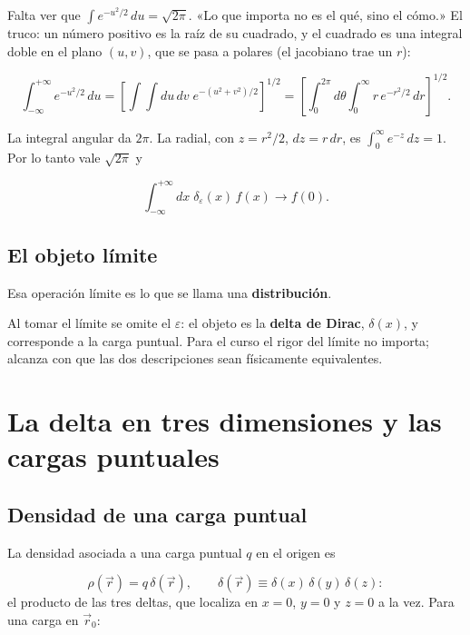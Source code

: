 \documentclass[12pt,a4paper]{article}
\begin{document}
Falta ver que $\int e^{-u^2/2}\,du = \sqrt{2\pi}$. «Lo que importa no es el
qué, sino el cómo.» El truco: un número positivo es la raíz de su cuadrado, y
el cuadrado es una integral doble en el plano $(u,v)$, que se pasa a polares
(el jacobiano trae un $r$):

\[
\int_{-\infty}^{+\infty} e^{-u^2/2}\,du
= \left[\int\!\!\int du\,dv\;e^{-(u^2+v^2)/2}\right]^{1/2}
= \left[\int_0^{2\pi}\!d\theta\int_0^{\infty}\! r\,e^{-r^2/2}\,dr\right]^{1/2}.
\]

La integral angular da $2\pi$. La radial, con $z = r^2/2$, $dz = r\,dr$, es
$\int_0^\infty e^{-z}\,dz = 1$. Por lo tanto vale $\sqrt{2\pi}$ y

\[
\int_{-\infty}^{+\infty} dx\;\delta_\varepsilon(x)\,f(x)\to f(0).
\]

\subsection{El objeto límite}

\begin{notebox}
Esa operación límite es lo que se
llama una \textbf{distribución}.
\end{notebox}

Al tomar el límite se omite el $\varepsilon$: el objeto es la \textbf{delta de
Dirac}, $\delta(x)$, y corresponde a la carga puntual. Para el curso el rigor
del límite no importa; alcanza con que las dos descripciones sean físicamente
equivalentes.

\section{La delta en tres dimensiones y las cargas puntuales}

\subsection{Densidad de una carga puntual}

La densidad asociada a una carga puntual $q$ en el origen es

\[
\rho(\vec r) = q\,\delta(\vec r),
\qquad
\delta(\vec r) \equiv \delta(x)\,\delta(y)\,\delta(z) :
\]
el producto de las tres deltas, que localiza en $x=0$, $y=0$ y $z=0$ a la vez.
Para una carga en $\vec r_0$:
\end{document}
